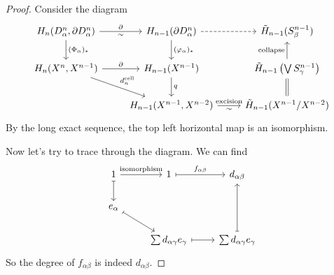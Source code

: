 \documentclass[a4paper]{article}
\theoremstyle{definition}
\begin{document}
\begin{proof}
  Consider the diagram
  \[
    \begin{tikzcd}
      H_n(D_\alpha^n, \partial D_\alpha^n) \ar[d, "(\Phi_\alpha)_*"] \ar[r, "\partial", "\sim"'] & H_{n - 1}(\partial D_\alpha^n)\ar[d, "(\varphi_\alpha)_*"] \ar[r, dashed] & \tilde{H}_{n - 1}(S^{n - 1}_\beta) \\
      H_n(X^n, X^{n - 1}) \ar[r, "\partial"] \ar[rd, "d_n^\mathrm{cell}"] & H_{n - 1}(X^{n - 1}) \ar[d, "q"] & \tilde{H}_{n - 1}\left(\bigvee S_\gamma^{n - 1}\right)\ar[u, "\text{collapse}"]\\
      & H_{n - 1}(X^{n - 1}, X^{n - 2}) \ar[r, "\text{excision}", "\sim"'] & \tilde{H}_{n - 1}(X^{n - 1}/X^{n - 2}) \ar[u, equals]
    \end{tikzcd}
  \]
  By the long exact sequence, the top left horizontal map is an isomorphism.

  Now let's try to trace through the diagram. We can find
  \[
    \begin{tikzcd}
      1 \ar[d, maps to] \ar[r, "\text{isomorphism}"] & 1 \ar[r, maps to, "f_{\alpha\beta}"]& d_{\alpha\beta}\\
      e_\alpha \ar[rd, maps to]\\
      & \sum d_{\alpha\gamma}e_\gamma \ar[r, maps to] & \sum d_{\alpha\gamma} e_\gamma \ar[uu, maps to]
    \end{tikzcd}
  \]
  So the degree of $f_{\alpha\beta}$ is indeed $d_{\alpha\beta}$.
\end{proof}
\end{document}
